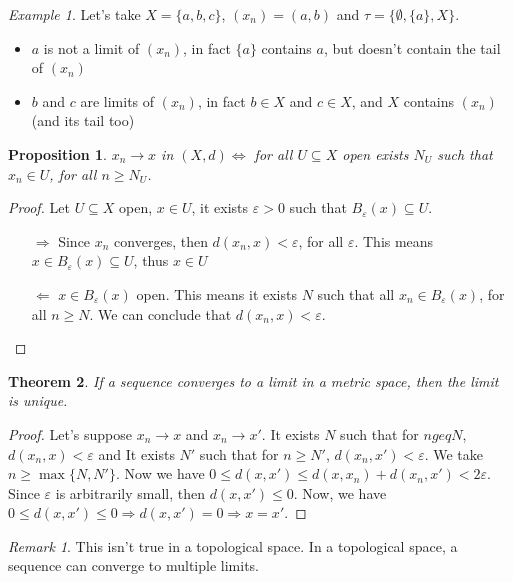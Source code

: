 \documentclass{article}
\newcommand{\Al}{\Leftarrow}
\newcommand{\Ar}{\Rightarrow}
\theoremstyle{definition}
\theoremstyle{definition}
\theoremstyle{plain}
\newtheorem{theorem}{Theorem}[section]
\theoremstyle{plain}
\theoremstyle{plain}
\theoremstyle{plain}
\newtheorem{proposition}[theorem]{Proposition}
\theoremstyle{definition}
\theoremstyle{remark}
\newtheorem{exampled}{Example}[definition]
\theoremstyle{remark}
\theoremstyle{remark}
\theoremstyle{remark}
\newtheorem*{remark}{Remark}
\newcommand{\E}{\varepsilon}
\begin{document}
\begin{exampled}
  Let's take $X = \{ a, b, c \}$, $(x_n) = (a, b)$ and $\tau = \{ \emptyset, \{ a \}, X \}$.
  \begin{itemize}
  \item $a$ is not a limit of $(x_n)$, in fact $\{ a \}$ contains $a$, but doesn't contain the tail of $(x_n)$
  \item $b$ and $c$ are limits of $(x_n)$, in fact $b \in X$ and $c \in X$, and $X$ contains $(x_n)$ (and its tail too)
  \end{itemize}
\end{exampled}


\begin{proposition}
  $x_n \to x$ in $(X, d) \iff$ for all $U \subseteq X$ open exists $N_U$ such that $x_n \in U$, for all $n \geq N_U$.
\end{proposition}

\begin{proof}
  Let $U \subseteq X$ open, $x \in U$, it exists $\E > 0$ such that $B_\E(x) \subseteq U$.
  \begin{itemize}
  \item[$\Ar$] Since $x_n$ converges, then $d(x_n,x) < \E$, for all $\E$. This means $x \in B_\E(x) \subseteq U$, thus $x \in U$
  \item[$\Al$] $x \in B_\E(x)$ open. This means it exists $N$ such that all $x_n \in B_\E(x)$, for all $n \geq N$. We can conclude that $d(x_n,x) < \E$.
  \end{itemize}
\end{proof}


\begin{theorem}
  If a sequence converges to a limit in a metric space, then the limit is unique.
\end{theorem}

\begin{proof}
  Let's suppose $x_n \to x$ and $x_n \to x'$. It exists $N$ such that for $n geq N$, $d(x_n,x) < \E$ and It exists $N'$ such that for $n \geq N'$, $d(x_n,x') < \E$. We take $n \geq \max\{ N, N' \}$. Now we have $0 \leq d(x,x') \leq d(x,x_n) + d(x_n,x') < 2\E$. Since $\E$ is arbitrarily small, then $d(x,x') \leq 0$. Now, we have $0 \leq d(x,x') \leq 0 \Ar d(x,x') = 0 \Ar x = x'$.
\end{proof}

\begin{remark}
  This isn't true in a topological space. In a topological space, a sequence can converge to multiple limits.
\end{remark}
\end{document}

